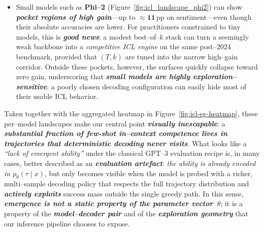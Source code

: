 \begin{itemize}[leftmargin=1.5em]
        (especially Vicuna--7B and Gemma--2 9B) exhibit ridges that are
        both \emph{tall and sharp}: small mis--specifications of $T$ or
        $k$ can substantially reduce gains. This highlights a practical
        tension: the exploration budget required to ``unlock'' emergent
        ICL behavior is often modest, but \emph{\textbf{finding the
        right $(T,k)$ operating point}} can itself be non--trivial,
        particularly if one insists on a single global configuration
        across tasks and domains.
  \item Small models such as \textbf{Phi--2}
        (Figure~\ref{fig:icl_landscape_phi2}) can show
        \emph{\textbf{pocket regions of high gain}}---up to
        $\mathbf{\approx 11}$\,pp on sentiment---even though their
        absolute accuracies are lower. For practitioners constrained to
        tiny models, this is \emph{\textbf{good news}}: a modest
        best--of--$k$ stack can turn a seemingly weak backbone into a
        \emph{competitive ICL engine} on the same post--2024 benchmark,
        provided that $(T,k)$ are tuned into the narrow high--gain
        corridor. Outside these pockets, however, the surfaces quickly
        collapse toward zero gain, underscoring that
        \emph{\textbf{small models are highly exploration--sensitive}}:
        a poorly chosen decoding configuration can easily hide most of
        their usable ICL behavior.
\end{itemize}

Taken together with the aggregated heatmap in
Figure~\ref{fig:icl-eg-heatmap}, these per--model landscapes make our
central point \emph{\textbf{visually inescapable}}: a
\emph{\textbf{substantial fraction of few-shot in--context competence
lives in trajectories that deterministic decoding never visits}}. What
looks like a \emph{``lack of emergent ability''} under the classical
GPT--3 evaluation recipe
\citep{brown2020language,wei2022emergent} is, in many cases, better
described as an \emph{\textbf{evaluation artefact}}:
\emph{the ability is already encoded in $p_\theta(\tau\mid x)$}, but
only becomes visible when the model is probed with a richer,
multi--sample decoding policy that respects the full trajectory
distribution and \emph{\textbf{actively exploits}} success mass outside
the single greedy path. In this sense, \emph{\textbf{emergence is not a
static property of the parameter vector~$\theta$}}; it is a property of
the \emph{\textbf{model--decoder pair}} and of the
\emph{\textbf{exploration geometry}} that our inference pipeline chooses
to expose.







